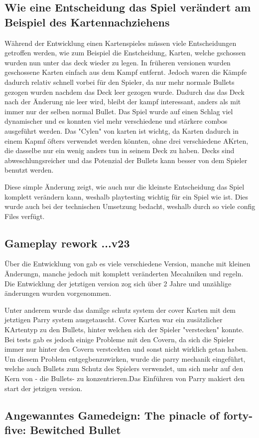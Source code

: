 
%


\subsection{Wie eine Entscheidung das Spiel verändert am Beispiel des Kartennachziehens}\label{subsec:placementMatters}

Während der Entwicklung einen Kartenspieles müssen viele Entscheidungen getroffen werden, wie zum Beispiel die Enstcheidung,
Karten, welche gschossen wurden nun unter das deck wieder zu legen. In früheren \FF versionen wurden geschossene Karten einfach aus dem Kampf entfernt.
Jedoch waren die Kämpfe dadurch relativ schnell vorbei für den Spieler, da nur mehr normale Bullets gezogen wurden nachdem das Deck leer gezogen wurde.
Dadurch das das Deck nach der Änderung nie leer wird, bleibt der kampf interessant, anders als mit immer nur der selben normal Bullet.
Das Spiel wurde auf einen Schlag viel dynamischer und es konnten viel mehr verschiedene und stärkere combos ausgeführt werden. Das "Cylen"
von karten ist wichtg, da Karten dadurch in einem Kapmf öfters verwendet werden könnten, ohne drei verschiedene AKrten,
die dasselbe nur ein wenig anders tun in seinem Deck zu haben. Decks sind abweschlungsreicher und das Potenzial der Bullets
kann besser von dem Spieler benutzt werden.


Diese simple Änderung zeigt, wie auch nur die kleinste Entscheidung das Spiel komplett verändern kann, weshalb playtesting
wichtig für ein Spiel wie \FF ist. Dies wurde auch bei der technischen Umsetzung bedacht, weshalb \FF durch so viele config Files verfügt.


\subsection{Gameplay rework ...v23}\label{subsec:placementMatters}
Über die Entwicklung von \FF gab es viele verschiedene Version, manche mit kleinen Änderungn, manche jedoch mit komplett veränderten Mecahniken und regeln.
Die Entwicklung der jetztigen version zog sich über 2 Jahre und unzählige änderungen wurden vorgenommen.


Unter anderem wurde das damilge schutz system der cover Karten mit dem jetztigen Parry system ausgetauscht. Cover Karten
war ein zusätzlicher KArtentyp zu den Bullets, hinter welchen sich der Spieler "verstecken" konnte. Bei tests gab es
jedoch einige Probleme mit den Covern, da sich die Spieler immer nur hinter den Covern verstcekten und sonst nicht wirklich getan haben.
Um diesem Problem entgegbenzuwirken, wurde die parry mechanik eingeführt, welche auch Bullets zum Schutz des Spielers verwendet,
um sich mehr auf den Kern von \FF - die Bullets- zu konzentrieren.Das Einführen von Parry makiert den start der jetzigen \FF version.



\subsection{Angewanntes Gamedeign: The pinacle of forty-five: Bewitched Bullet}\label{subsec:placementMatters}


\renewcommand{\kapitelautor}{}
